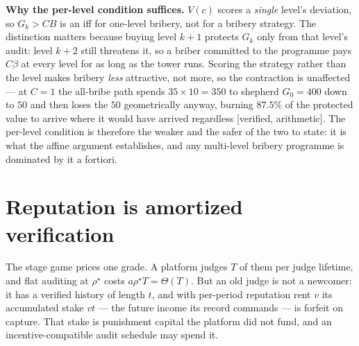 \documentclass[11pt,a4paper]{article}
\begin{document}
\textbf{Why the per-level condition suffices.} $V(c)$ scores a \emph{single} level's deviation, so $G_k > CB$ is an iff for one-level bribery, not for a bribery strategy. The distinction matters because buying level $k{+}1$ protects $G_k$ only from that level's audit: level $k{+}2$ still threatens it, so a briber committed to the programme pays $C\beta$ at every level for as long as the tower runs. Scoring the strategy rather than the level makes bribery \emph{less} attractive, not more, so the contraction is unaffected --- at $C{=}1$ the all-bribe path spends $35 \times 10 = 350$ to shepherd $G_0 = 400$ down to $50$ and then loses the $50$ geometrically anyway, burning $87.5\%$ of the protected value to arrive where it would have arrived regardless [verified, arithmetic]. The per-level condition is therefore the weaker and the safer of the two to state: it is what the affine argument establishes, and any multi-level bribery programme is dominated by it a fortiori.

\section{Reputation is amortized verification}\label{sec:amort}
The stage game prices one grade. A platform judges $T$ of them per judge lifetime, and flat auditing at $\rho^\star$ costs $a\rho^\star T = \Theta(T)$. But an old judge is not a newcomer: it has a verified history of length $t$, and with per-period reputation rent $v$ its accumulated stake $vt$ --- the future income its record commands --- is forfeit on capture. That stake is punishment capital the platform did not fund, and an incentive-compatible audit schedule may spend it.
\end{document}
